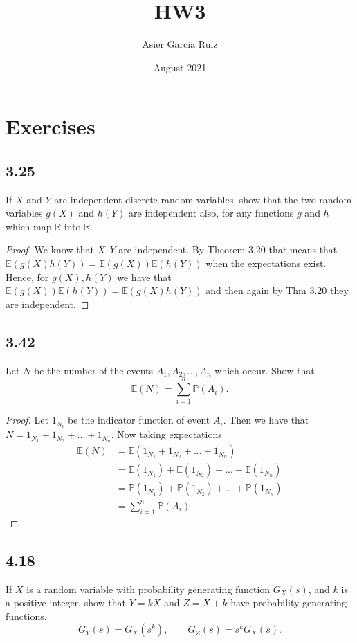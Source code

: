 \documentclass{article}
\title{HW3}
\author{Asier Garcia Ruiz }
\date{August 2021}
\newcommand{\R}{\mathbb{R}}
\renewcommand{\P}[1]{\mathbb{P}(#1)}
\newcommand{\E}[1]{\mathbb{E}(#1)}
\begin{document}
\maketitle

\section*{Exercises}
\subsection*{3.25} %
If $X$ and $Y$ are independent discrete random variables, show that the two random
variables $g(X)$ and $h(Y)$ are independent also, for any functions $g$ and $h$
which map $\R$ into $\R$.

\begin{proof}
    We know that $X,Y$ are independent. By Theorem 3.20 that means that
    $\E{g(X)h(Y)} = \E{g(X)}\E{h(Y)}$ when the expectations exist. Hence,
    for $g(X), h(Y)$ we have that $\E{g(X)}\E{h(Y)} = \E{g(X)h(Y)}$ and
    then again by Thm 3.20 they are independent.
\end{proof}
\subsection*{3.42} %
Let $N$ be the number of the events $A_1, A_2, . . . , A_n$ which occur. Show that
$$\E{N}= \sum_{i=1}^n \P{A_i}.$$

\begin{proof}
    Let $1_{N_i}$ be the indicator function of event $A_i$. Then we have that
    ${N=1_{N_1} +1_{N_2} + ... + 1_{N_n}}$. Now taking expectations
    \begin{align*}
        \E{N} & = \E{1_{N_1} +1_{N_2} + ... + 1_{N_n}}          \\
              & = \E{1_{N_1}} + \E{1_{N_2}} + ... + \E{1_{N_n}} \\
              & = \P{1_{N_1}} + \P{1_{N_2}} + ... + \P{1_{N_n}} \\
              & = \sum_{i=1}^n \P{A_i}
    \end{align*}
\end{proof}
\subsection*{4.18} %
If $X$ is a random variable with probability generating function $G_X(s)$,
and $k$ is a positive integer, show that $Y = kX$ and $Z = X + k$ have
probability generating functions.
$$G_Y(s) = G_X(s^k), \qquad G_Z(s) = s^k G_X(s).$$
\end{document}
